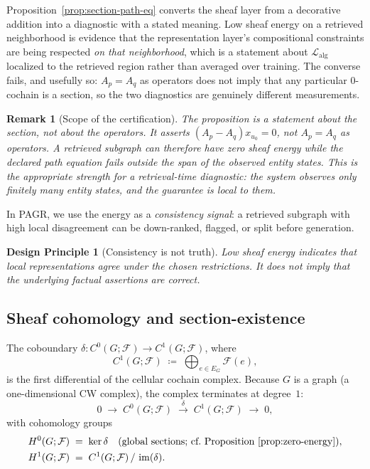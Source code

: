 \documentclass[11pt]{article}
\newtheorem{remark}[definition]{Remark}
\newtheorem{principle}[definition]{Design Principle}
\newcommand{\Lcal}{\mathcal{L}}
\newcommand{\F}{\mathcal{F}}
\begin{document}
Proposition~\ref{prop:section-path-eq} converts the sheaf layer from a decorative addition into a diagnostic with a stated meaning. Low sheaf energy on a retrieved neighborhood is evidence that the representation layer's compositional constraints are being respected \emph{on that neighborhood}, which is a statement about $\Lcal_{\mathrm{alg}}$ localized to the retrieved region rather than averaged over training. The converse fails, and usefully so: $A_p=A_q$ as operators does not imply that any particular $0$-cochain is a section, so the two diagnostics are genuinely different measurements.

\begin{remark}[Scope of the certification]
The proposition is a statement about the section, not about the operators. It asserts $(A_p-A_q)x_{u_0}=0$, not $A_p=A_q$ as operators. A retrieved subgraph can therefore have zero sheaf energy while the declared path equation fails outside the span of the observed entity states. This is the appropriate strength for a retrieval-time diagnostic: the system observes only finitely many entity states, and the guarantee is local to them.
\end{remark}

In PAGR, we use the energy as a \emph{consistency signal}: a retrieved subgraph with high local disagreement can be down-ranked, flagged, or split before generation.

\begin{principle}[Consistency is not truth]
Low sheaf energy indicates that local representations agree under the chosen restrictions. It does not imply that the underlying factual assertions are correct.
\end{principle}

\subsection{Sheaf cohomology and section-existence}
\label{sec:sheaf-cohomology}

The coboundary $\delta:C^0(G;\F)\to C^1(G;\F)$, where
\[
C^1(G;\F)\;\coloneqq\;\bigoplus_{e\in E_G}\F(e),
\]
is the first differential of the cellular cochain complex. Because $G$ is a graph (a one-dimensional CW complex), the complex terminates at degree~$1$:
\[
0\;\longrightarrow\; C^0(G;\F)\;\xrightarrow{\;\delta\;}\; C^1(G;\F)\;\longrightarrow\;0,
\]
with cohomology groups
\begin{align*}
H^0(G;\F)&\;=\;\ker\delta\quad\text{(global sections; cf.\ Proposition~\ref{prop:zero-energy})},\\
H^1(G;\F)&\;=\;C^1(G;\F)\,/\,\operatorname{im}(\delta).
\end{align*}
\end{document}
